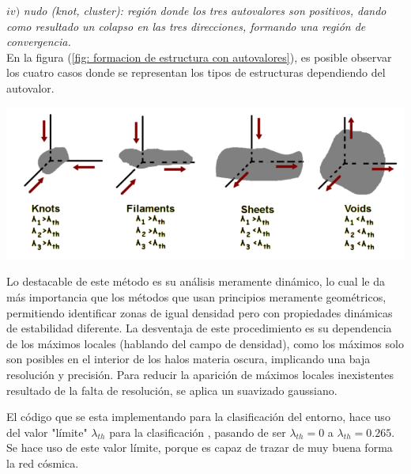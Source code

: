 $iv)$ {\it{nudo (knot, cluster)}: región donde los tres autovalores son positivos, dando como resultado un colapso en las tres direcciones, formando una región de convergencia.}\\

En la figura (\ref{fig: formacion de estructura con autovalores}), es posible observar los cuatro casos donde se representan los tipos de estructuras dependiendo del autovalor.
%
\begin{center}
\includegraphics[scale=.39]{./figures/5_Algoritmo_Modelacion/formacion_estructuras.png}
\label{fig: formacion de estructura con autovalores}
\end{center}
%
Lo destacable de este método es su análisis meramente dinámico, lo cual le da más importancia que los métodos que usan principios meramente geométricos, permitiendo identificar zonas de igual densidad pero con propiedades dinámicas de estabilidad diferente. La desventaja de este procedimiento es su dependencia de los máximos locales (hablando del campo de densidad), como los máximos solo son posibles en el interior de los halos materia oscura, implicando una baja resolución y precisión. Para reducir la aparición de máximos locales inexistentes resultado de la falta de resolución, se aplica un suavizado gaussiano.


El código que se esta implementando para la clasificación del entorno, hace uso del valor "límite" $\lambda_{th}$ para la clasificación \cite{bustamante2015}, pasando de ser $\lambda_{th}=0$ a $\lambda_{th}=0.265$. Se hace uso de este valor límite, porque es capaz de trazar de muy buena forma la red cósmica. 

